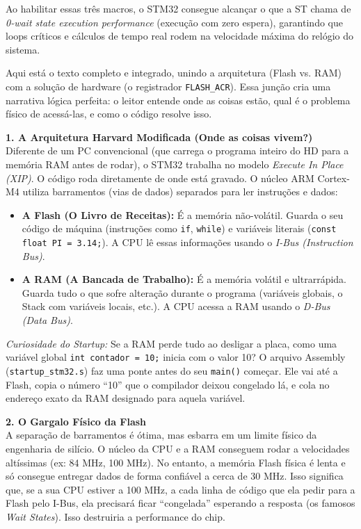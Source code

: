 \documentclass[12pt,a4paper]{article}
\begin{document}
Ao habilitar essas três macros, o STM32 consegue alcançar o que a ST chama de \textit{0-wait state execution performance} (execução com zero espera), garantindo que loops críticos e cálculos de tempo real rodem na velocidade máxima do relógio do sistema.

Aqui está o texto completo e integrado, unindo a arquitetura (Flash vs. RAM) com a solução de hardware (o registrador \texttt{FLASH\_ACR}). Essa junção cria uma narrativa lógica perfeita: o leitor entende onde as coisas estão, qual é o problema físico de acessá-las, e como o código resolve isso.

\vspace{0.3cm}
\noindent\textbf{1. A Arquitetura Harvard Modificada (Onde as coisas vivem?)}\\
Diferente de um PC convencional (que carrega o programa inteiro do HD para a memória RAM antes de rodar), o STM32 trabalha no modelo \textit{Execute In Place (XIP)}. O código roda diretamente de onde está gravado.
O núcleo ARM Cortex-M4 utiliza barramentos (vias de dados) separados para ler instruções e dados:
\begin{itemize}
    \item \textbf{A Flash (O Livro de Receitas):} É a memória não-volátil. Guarda o seu código de máquina (instruções como \texttt{if}, \texttt{while}) e variáveis literais (\texttt{const float PI = 3.14;}). A CPU lê essas informações usando o \textit{I-Bus (Instruction Bus)}.
    \item \textbf{A RAM (A Bancada de Trabalho):} É a memória volátil e ultrarrápida. Guarda tudo o que sofre alteração durante o programa (variáveis globais, o Stack com variáveis locais, etc.). A CPU acessa a RAM usando o \textit{D-Bus (Data Bus)}.
\end{itemize}

\textit{Curiosidade do Startup:} Se a RAM perde tudo ao desligar a placa, como uma variável global \texttt{int contador = 10;} inicia com o valor 10? O arquivo Assembly (\texttt{startup\_stm32.s}) faz uma ponte antes do seu \texttt{main()} começar. Ele vai até a Flash, copia o número ``10'' que o compilador deixou congelado lá, e cola no endereço exato da RAM designado para aquela variável.

\vspace{0.3cm}
\noindent\textbf{2. O Gargalo Físico da Flash}\\
A separação de barramentos é ótima, mas esbarra em um limite físico da engenharia de silício. O núcleo da CPU e a RAM conseguem rodar a velocidades altíssimas (ex: 84 MHz, 100 MHz). No entanto, a memória Flash física é lenta e só consegue entregar dados de forma confiável a cerca de 30 MHz.
Isso significa que, se a sua CPU estiver a 100 MHz, a cada linha de código que ela pedir para a Flash pelo I-Bus, ela precisará ficar ``congelada'' esperando a resposta (os famosos \textit{Wait States}). Isso destruiria a performance do chip.
\end{document}
